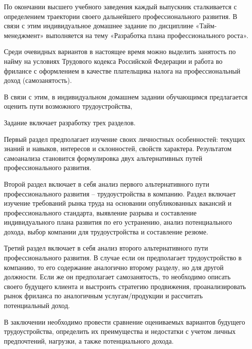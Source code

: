 По окончании высшего учебного заведения каждый выпускник сталкивается с определением траектории своего дальнейшего профессионального развития. В связи с этим индивидуальное домашнее задание по дисциплине «Тайм-менеджмент» выполняется на тему «Разработка плана профессионального роста».

Среди очевидных вариантов в настоящее время можно выделить занятость по найму на условиях Трудового кодекса Российской Федерации и работа во фрилансе с оформлением в качестве плательщика налога на профессиональный доход (самозанятость). 

В связи с этим, в индивидуальном домашнем задании обучающимся предлагается оценить пути возможного трудоустройства, 

Задание включает разработку трех разделов. 

Первый раздел предполагает изучение своих личностных особенностей: текущих знаний и навыков, интересов и склонностей, свойств характера. Результатом самоанализа становится формулировка двух альтернативных путей профессионального развития.

Второй раздел включает в себя анализ первого альтернативного пути профессионального развития – трудоустройства в компанию. Раздел включает изучение требований рынка труда на основании опубликованных вакансий и профессионального стандарта, выявление разрыва и составление индивидуального плана развития по его устранению, анализ потенциального дохода, выбор компании для трудоустройства и составление резюме. 

Третий раздел включает в себя анализ второго альтернативного пути профессионального развития. В случае если он предполагает трудоустройство в компанию, то его содержание аналогично второму разделу, но для другой должности. Если же он предполагает самозанятость, то необходимо описать  своего будущего клиента и выстроить стратегию продвижения, проанализировать рынок фриланса по аналогичным услугам/продукции и рассчитать потенциальный доход.


В заключении необходимо провести сравнение оцениваемых вариантов будущего трудоустройства, определить их преимущества и недостатки с учетом личных предпочтений, нагрузки, а также потенциального дохода.
